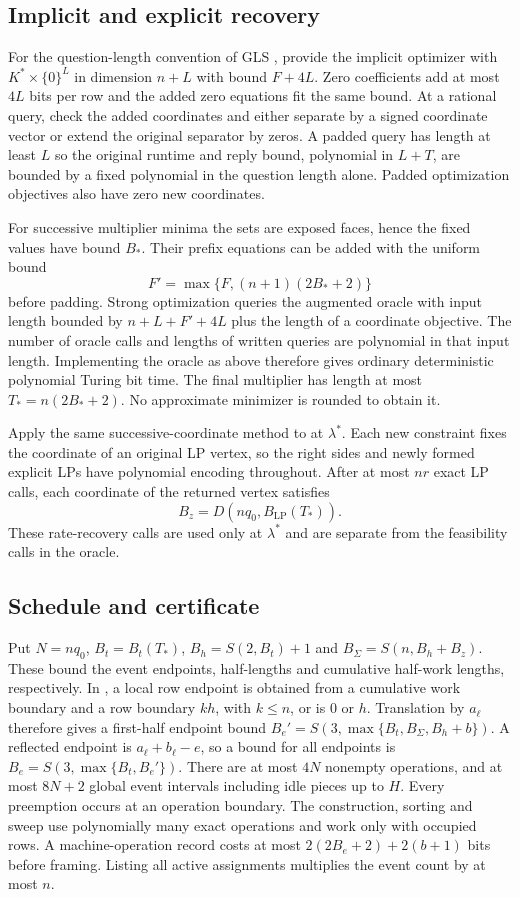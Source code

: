 \subsection{Implicit and explicit recovery}
For the question-length convention of GLS \cite[(1.2.1), pp.~26--27]{gls1988}, provide the implicit optimizer with $K^*\times\{0\}^L$ in dimension $n+L$ with bound $F+4L$. Zero coefficients add at most $4L$ bits per row and the added zero equations fit the same bound. At a rational query, check the added coordinates and either separate by a signed coordinate vector or extend the original separator by zeros. A padded query has length at least $L$ so the original runtime and reply bound, polynomial in $L+T$, are bounded by a fixed polynomial in the question length alone. Padded optimization objectives also have zero new coordinates.

For successive multiplier minima the sets are exposed faces, hence the fixed values have bound $B_*$. Their prefix equations can be added with the uniform bound
\[
 F'=\max\{F,(n+1)(2B_*+2)\}
\]
before padding. Strong optimization queries the augmented oracle with input length bounded by $n+L+F'+4L$ plus the length of a coordinate objective. The number of oracle calls and lengths of written queries are polynomial in that input length. Implementing the oracle as above therefore gives ordinary deterministic polynomial Turing bit time. The final multiplier has length at most $T_*=n(2B_*+2)$. No approximate minimizer is rounded to obtain it.

Apply the same successive-coordinate method to \FaceLP{} at $\lambda^*$. Each new constraint fixes the coordinate of an original LP vertex, so the right sides and newly formed explicit LPs have polynomial encoding throughout. After at most $nr$ exact LP calls, each coordinate of the returned vertex satisfies
\[
 B_z=D(nq_0,B_{\mathrm{LP}}(T_*)).
\]
These rate-recovery calls are used only at $\lambda^*$ and are separate from the feasibility calls in the oracle.

\subsection{Schedule and certificate}
Put $N=nq_0$, $B_t=B_t(T_*)$, $B_h=S(2,B_t)+1$ and $B_\Sigma=S(n,B_h+B_z)$. These bound the event endpoints, half-lengths and cumulative half-work lengths, respectively. In , a local row endpoint is obtained from a cumulative work boundary and a row boundary $kh$, with $k\leq n$, or is $0$ or $h$. Translation by $a_\ell$ therefore gives a first-half endpoint bound $B_e'=S(3,\max\{B_t,B_\Sigma,B_h+b\})$. A reflected endpoint is $a_\ell+b_\ell-e$, so a bound for all endpoints is $B_e=S(3,\max\{B_t,B_e'\})$. There are at most $4N$ nonempty operations, and at most $8N+2$ global event intervals including idle pieces up to $H$. Every preemption occurs at an operation boundary. The construction, sorting and sweep use polynomially many exact operations and work only with occupied rows. A machine-operation record costs at most $2(2B_e+2)+2(b+1)$ bits before framing. Listing all active assignments multiplies the event count by at most $n$.


